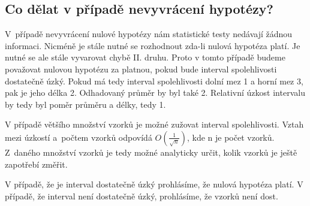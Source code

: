 \subsection{Co dělat v případě nevyvrácení hypotézy?}

V~případě nevyvrácení nulové hypotézy nám statistické testy nedávají žádnou informaci.
Nicméně je stále nutné se rozhodnout zda-li nulová hypotéza platí. Je nutné se ale stále
vyvarovat chybě II. druhu. Proto v tomto případě budeme považovat nulovou hypotézu za platnou,
pokud bude interval spolehlivosti dostatečně úzký. Pokud má tedy interval spolehlivosti
dolní mez 1 a horní mez 3, pak je jeho délka 2. Odhadovaný průměr by byl také 2.
Relativní úzkost intervalu by tedy byl poměr průměru a délky, tedy 1.

V případě většího množství vzorků je možné zužovat interval spolehlivosti. Vztah mezi
úzkostí a~počtem vzorků odpovídá $O(\frac{1}{\sqrt{n}})$, kde n je počet vzorků. Z~daného
množství vzorků je tedy možné analyticky určit, kolik vzorků je ještě zapotřebí změřit.


V případě, že je interval dostatečně úzký prohlásíme, že nulová hypotéza platí.
V případě, že interval není dostatečně úzký, prohlásíme, že vzorků není dost.
